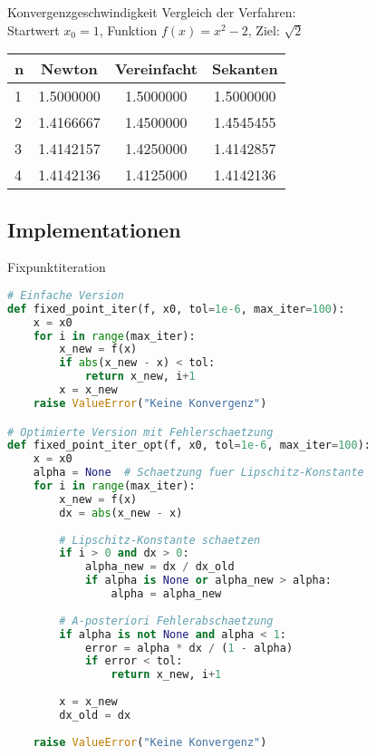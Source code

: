 \begin{example2}{Konvergenzgeschwindigkeit} Vergleich der Verfahren:
    \vspace{1mm}\\
    Startwert $x_0 = 1$, Funktion $f(x) = x^2 - 2$, Ziel: $\sqrt{2}$
    \begin{center}
    \begin{tabular}{l|c|c|c}
    n & Newton & Vereinfacht & Sekanten \\\hline
    1 & 1.5000000 & 1.5000000 & 1.5000000\\
    2 & 1.4166667 & 1.4500000 & 1.4545455\\
    3 & 1.4142157 & 1.4250000 & 1.4142857\\
    4 & 1.4142136 & 1.4125000 & 1.4142136
    \end{tabular}
    \end{center}
\end{example2}

\subsection{Implementationen}

\begin{examplecode}{Fixpunktiteration}
\begin{lstlisting}[language=Python, style=basesmol]
# Einfache Version
def fixed_point_iter(f, x0, tol=1e-6, max_iter=100):
    x = x0
    for i in range(max_iter):
        x_new = f(x)
        if abs(x_new - x) < tol:
            return x_new, i+1
        x = x_new
    raise ValueError("Keine Konvergenz")

# Optimierte Version mit Fehlerschaetzung
def fixed_point_iter_opt(f, x0, tol=1e-6, max_iter=100):
    x = x0
    alpha = None  # Schaetzung fuer Lipschitz-Konstante
    for i in range(max_iter):
        x_new = f(x)
        dx = abs(x_new - x)
        
        # Lipschitz-Konstante schaetzen
        if i > 0 and dx > 0:
            alpha_new = dx / dx_old
            if alpha is None or alpha_new > alpha:
                alpha = alpha_new
        
        # A-posteriori Fehlerabschaetzung
        if alpha is not None and alpha < 1:
            error = alpha * dx / (1 - alpha)
            if error < tol:
                return x_new, i+1
                
        x = x_new
        dx_old = dx
        
    raise ValueError("Keine Konvergenz")
\end{lstlisting}
\end{examplecode}

